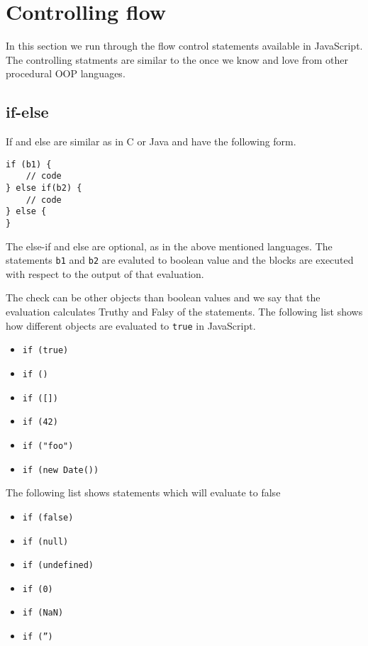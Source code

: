 \section{Controlling flow}\label{sec:flow_control}
In this section we run through the flow control statements available in JavaScript. The controlling statments are similar to the once we know and love from other procedural OOP languages.

\subsection{if-else}
If and else are similar as in C or Java and have the following form.
\begin{lstlisting}
if (b1) {
    // code
} else if(b2) {
    // code
} else {
}
\end{lstlisting}

The else-if and else are optional, as in the above mentioned languages. The statements \texttt{b1} and \texttt{b2} are evaluted to boolean value and the blocks are executed with respect to the output of that evaluation.

The check can be other objects than boolean values and we say that the evaluation calculates Truthy and Falsy of the statements. The following list shows how different objects are evaluated to \texttt{true} in JavaScript.

\begin{itemize}
\item \texttt{if (true)}
\item \texttt{if ({})}
\item \texttt{if ([])}
\item \texttt{if (42)}
\item \texttt{if ("foo")}
\item \texttt{if (new Date())}
\end{itemize}

The following list shows statements which will evaluate to false

\begin{itemize}
\item \texttt{if (false)}
\item \texttt{if (null)}
\item \texttt{if (undefined)}
\item \texttt{if (0)}
\item \texttt{if (NaN)}
\item \texttt{if ('')}
\end{itemize}

